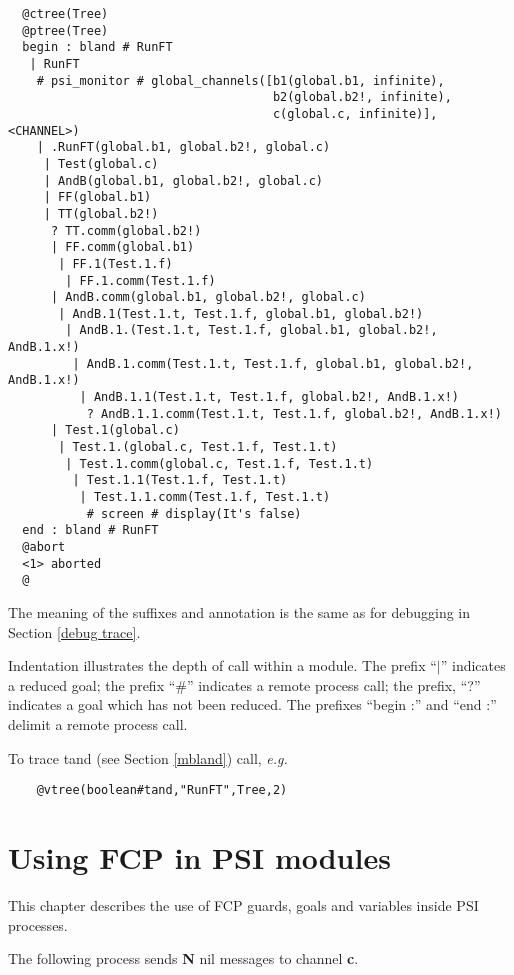 \begin{verbatim}
  @ctree(Tree)
  @ptree(Tree)
  begin : bland # RunFT
   | RunFT
    # psi_monitor # global_channels([b1(global.b1, infinite),
                                     b2(global.b2!, infinite),
                                     c(global.c, infinite)], <CHANNEL>)
    | .RunFT(global.b1, global.b2!, global.c)
     | Test(global.c)
     | AndB(global.b1, global.b2!, global.c)
     | FF(global.b1)
     | TT(global.b2!)
      ? TT.comm(global.b2!)
      | FF.comm(global.b1)
       | FF.1(Test.1.f)
        | FF.1.comm(Test.1.f)
      | AndB.comm(global.b1, global.b2!, global.c)
       | AndB.1(Test.1.t, Test.1.f, global.b1, global.b2!)
        | AndB.1.(Test.1.t, Test.1.f, global.b1, global.b2!, AndB.1.x!)
         | AndB.1.comm(Test.1.t, Test.1.f, global.b1, global.b2!, AndB.1.x!)
          | AndB.1.1(Test.1.t, Test.1.f, global.b2!, AndB.1.x!)
           ? AndB.1.1.comm(Test.1.t, Test.1.f, global.b2!, AndB.1.x!)
      | Test.1(global.c)
       | Test.1.(global.c, Test.1.f, Test.1.t)
        | Test.1.comm(global.c, Test.1.f, Test.1.t)
         | Test.1.1(Test.1.f, Test.1.t)
          | Test.1.1.comm(Test.1.f, Test.1.t)
           # screen # display(It's false)
  end : bland # RunFT
  @abort
  <1> aborted
  @
\end{verbatim}

\noindent
The meaning of the suffixes and annotation is the same as for
debugging in Section \ref{debug trace}.

\noindent
Indentation illustrates the depth of call within a module.
The prefix ``$|$'' indicates a reduced goal; the prefix
``\#'' indicates a remote process call; the prefix,
``?''  indicates a goal which has not been reduced.  The
prefixes ``begin :'' and ``end :'' delimit a remote process
call.

\noindent
To trace tand (see Section \ref{mbland}) call, {\em e.g.}

\begin{verbatim}
    @vtree(boolean#tand,"RunFT",Tree,2)
\end{verbatim}

\chapter{Using FCP in PSI modules}
\label{usingFCP}

This chapter describes the use of FCP guards, goals and
variables inside PSI processes.

The following process sends {\bf N} nil messages to channel {\bf c}.

